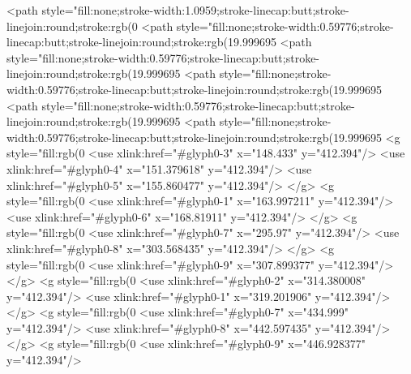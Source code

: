 <path style="fill:none;stroke-width:1.0959;stroke-linecap:butt;stroke-linejoin:round;stroke:rgb(0%
<path style="fill:none;stroke-width:0.59776;stroke-linecap:butt;stroke-linejoin:round;stroke:rgb(19.999695%
<path style="fill:none;stroke-width:0.59776;stroke-linecap:butt;stroke-linejoin:round;stroke:rgb(19.999695%
<path style="fill:none;stroke-width:0.59776;stroke-linecap:butt;stroke-linejoin:round;stroke:rgb(19.999695%
<path style="fill:none;stroke-width:0.59776;stroke-linecap:butt;stroke-linejoin:round;stroke:rgb(19.999695%
<path style="fill:none;stroke-width:0.59776;stroke-linecap:butt;stroke-linejoin:round;stroke:rgb(19.999695%
<g style="fill:rgb(0%
  <use xlink:href="#glyph0-3" x="148.433" y="412.394"/>
  <use xlink:href="#glyph0-4" x="151.379618" y="412.394"/>
  <use xlink:href="#glyph0-5" x="155.860477" y="412.394"/>
</g>
<g style="fill:rgb(0%
  <use xlink:href="#glyph0-1" x="163.997211" y="412.394"/>
  <use xlink:href="#glyph0-6" x="168.81911" y="412.394"/>
</g>
<g style="fill:rgb(0%
  <use xlink:href="#glyph0-7" x="295.97" y="412.394"/>
  <use xlink:href="#glyph0-8" x="303.568435" y="412.394"/>
</g>
<g style="fill:rgb(0%
  <use xlink:href="#glyph0-9" x="307.899377" y="412.394"/>
</g>
<g style="fill:rgb(0%
  <use xlink:href="#glyph0-2" x="314.380008" y="412.394"/>
  <use xlink:href="#glyph0-1" x="319.201906" y="412.394"/>
</g>
<g style="fill:rgb(0%
  <use xlink:href="#glyph0-7" x="434.999" y="412.394"/>
  <use xlink:href="#glyph0-8" x="442.597435" y="412.394"/>
</g>
<g style="fill:rgb(0%
  <use xlink:href="#glyph0-9" x="446.928377" y="412.394"/>
